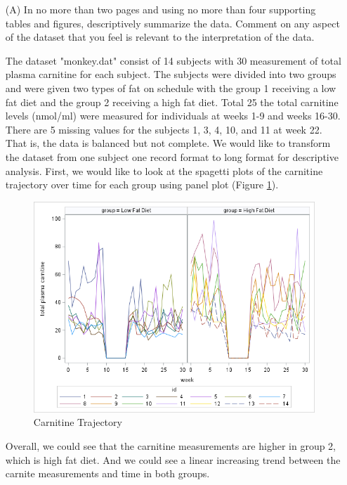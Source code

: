 							\begin{itemize}
							  \vspace{0.2cm} 
								\item[(A)] In no more than two pages and using no more than four supporting tables and figures, descriptively 
													 summarize the data. Comment on any aspect of the dataset that you
													 feel is relevant to the interpretation of the data. \vspace{0.2cm}

The dataset "monkey.dat" consist of 14 subjects with 30 measurement of total plasma carnitine for each subject. The subjects were divided into two groups and were given two types of fat on schedule with the group 1 receiving a low fat diet and the group 2 receiving a high fat diet. Total 25 the total carnitine levels (nmol/ml) were measured for individuals at weeks 1-9 and weeks 16-30. There are 5 missing values for the subjects 1, 3, 4, 10, and 11 at week 22. That is, the data is balanced but not complete.
We would like to transform the dataset from one subject one record format to long format for descriptive analysis. First, we would like to look at the spagetti plots of the carnitine trajectory over time for each group using panel plot (Figure \ref{fig:desc1}). 

\begin{figure}[h]
    \centering
    \includegraphics[scale=0.8]{HW4/img/desc1.png}
    \caption{Carnitine Trajectory}
\label{fig:desc1}
\end{figure}

Overall, we could see that the carnitine measurements are higher in group 2, which is high fat diet. And we could see a linear increasing trend between the carnite measurements and time in both groups. 


\end{itemize}
